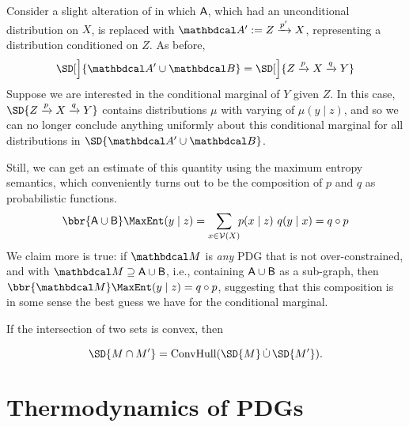 \begin{vfull}
\begin{example}[composition]
	Consider a slight alteration of  in which $\sf A$, which had an unconditional distribution on $X$, is replaced with $\dg A' := Z \xrightarrow{p'} X$, representing a distribution conditioned on $Z$. 
	As before,
	\[ \SD[\Big]{{\dg A' \cup \dg B}} = \SD[\Big]{{Z} \xrightarrow{p} X \xrightarrow{q} Y} \]
	Suppose we are interested in the conditional marginal of $Y$ given $Z$. In this case, $\SD{{Z} \xrightarrow{p} X \xrightarrow{q} Y} $ contains distributions $\mu$ with varying of $\mu(y \mid z)$, and so we can no longer conclude anything uniformly about this conditional marginal for all distributions in $\SD{{\dg A' \cup \dg B}}$. 
	
	Still, we can get an estimate of this quantity using the maximum entropy semantics, which conveniently turns out to be the composition of $p$ and $q$ as probabilistic functions.
	$$ \bbr{{\sf A \cup B}}\MaxEnt(y \mid z) = \sum_{x \in \V(X)}\!\! p (x \mid z)\ q(y \mid x) = q \circ p $$
	We claim more is true: if $\dg M$ is \emph{any} PDG that is not over-constrained, and with $\dg M \supseteq \sf A \cup B$, i.e., containing $\sf A \cup B$ as a sub-graph, then
	$ \bbr{\dg M}\MaxEnt(y \mid z) = q \circ p$,
	suggesting that this composition is in some sense the best guess we have for the conditional marginal. 
\end{example}

\begin{vleftovers}
If the intersection of two sets is convex, then 
\begin{conj}\label{prop:intersect-set-semantics}
	\[ \SD{M \cap M'} = \text{ConvHull}(\SD{M} \mathop{\dot\cup} \SD{M'}).\]
\end{conj}
\end{vleftovers}
\end{vfull}

\section{Thermodynamics of PDGs}\label{sec:thermo}


